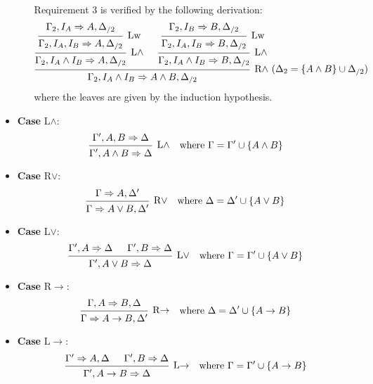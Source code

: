 \documentclass[a4paper]{article}
\begin{document}
\begin{itemize}
\begin{enumerate}
    Requirement 3 is verified by the following derivation:
    \[
      \begin{prooftree}
        \hypo{\Gamma_2,I_A \Rightarrow A, \Delta_{/2}}
        \infer1[Lw]{\Gamma_2,I_A, I_B \Rightarrow A, \Delta_{/2}}
        \infer1[L$\wedge$]{\Gamma_2,I_A \wedge I_B \Rightarrow A, \Delta_{/2}}
        \hypo{\Gamma_2,I_B \Rightarrow B, \Delta_{/2}}
        \infer1[Lw]{\Gamma_2,I_A, I_B \Rightarrow B, \Delta_{/2}}
        \infer1[L$\wedge$]{\Gamma_2,I_A \wedge I_B \Rightarrow B, \Delta_{/2}}
        \infer2[R$\wedge$ ($\Delta_2 = \{A \wedge B\} \cup \Delta_{/2}$)]{\Gamma_2,I_A \wedge I_B \Rightarrow A \wedge B, \Delta_{/2}}
      \end{prooftree}
    \]
    where the leaves are given by the induction hypothesis.
  \end{enumerate}
\item \textbf{Case} L$\wedge$:
  \begin{align*}
    \begin{prooftree}
      \hypo{\Gamma',A,B \Rightarrow \Delta}
      \infer1[L$\wedge$]{\Gamma',A \wedge B \Rightarrow \Delta}
    \end{prooftree}
    && \text{where $\Gamma = \Gamma' \cup \{A \wedge B\}$}
  \end{align*}
\item \textbf{Case} R$\vee$:
  \begin{align*}
    \begin{prooftree}
      \hypo{\Gamma \Rightarrow A, \Delta'}
      \infer1[R$\vee$]{\Gamma \Rightarrow A \vee B, \Delta'}
    \end{prooftree}
    && \text{where $\Delta = \Delta' \cup \{A \vee B\}$}
  \end{align*}
\item \textbf{Case} L$\vee$:
  \begin{align*}
    \begin{prooftree}
      \hypo{\Gamma', A \Rightarrow \Delta}
      \hypo{\Gamma', B \Rightarrow \Delta}
      \infer2[L$\vee$]{\Gamma', A \vee B \Rightarrow \Delta}
    \end{prooftree}
    && \text{where $\Gamma = \Gamma' \cup \{A \vee B\}$}
  \end{align*}
\item \textbf{Case} R$\to$:
  \begin{align*}
    \begin{prooftree}
      \hypo{\Gamma, A \Rightarrow B, \Delta}
      \infer1[R$\to$]{\Gamma \Rightarrow A \to B, \Delta'}
    \end{prooftree}
    && \text{where $\Delta = \Delta' \cup \{A \to B\}$}
  \end{align*}
\item \textbf{Case} L$\to$:
  \begin{align*}
    \begin{prooftree}
      \hypo{\Gamma' \Rightarrow A, \Delta}
      \hypo{\Gamma', B \Rightarrow \Delta}
      \infer2[L$\to$]{\Gamma', A \to B \Rightarrow \Delta}
    \end{prooftree}
    && \text{where $\Gamma = \Gamma' \cup \{A \to B\}$}
  \end{align*}
\end{itemize}

% 
% 
\end{document}
